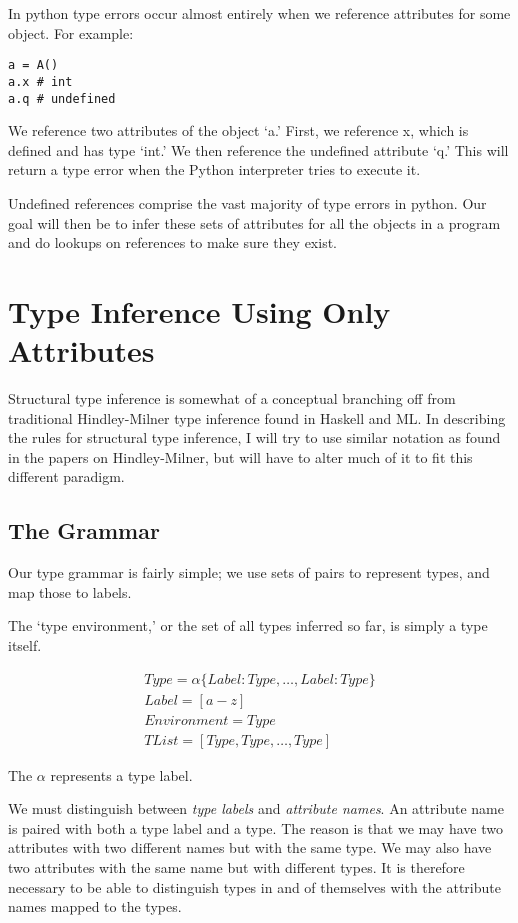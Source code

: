 \documentclass{article}
\begin{document}
In python type errors occur almost entirely when we reference attributes for some object. For example:

\begin{verbatim}
a = A()
a.x # int
a.q # undefined
\end{verbatim}

We reference two attributes of the object `a.' First, we reference x, which is
defined and has type `int.' We then reference the undefined attribute `q.' This
will return a type error when the Python interpreter tries to execute it.

Undefined references comprise the vast majority of type errors in python. Our
goal will then be to infer these sets of attributes for all the objects in a
program and do lookups on references to make sure they exist.

\section*{Type Inference Using Only Attributes}

Structural type inference is somewhat of a conceptual branching off from
traditional Hindley-Milner type inference found in Haskell and ML. In
describing the rules for structural type inference, I will try to use similar
notation as found in the papers on Hindley-Milner, but will have to alter much
of it to fit this different paradigm.

\subsection*{The Grammar}

Our type grammar is fairly simple; we use sets of pairs to represent types, and
map those to labels.

The `type environment,' or the set of all types inferred so far, is simply a
type itself.

\begin{align*}
Type = \alpha\{ Label : Type, \dots, Label : Type \} \\
Label = [a-z] \\
Environment = Type \\
TList = [Type, Type, \dots, Type]
\end{align*}

The $\alpha$ represents a type label.

We must distinguish between \emph{type labels} and \emph{attribute names}.  An
attribute name is paired with both a type label and a type. The reason is that
we may have two attributes with two different names but with the same type. We
may also have two attributes with the same name but with different types. It is
therefore necessary to be able to distinguish types in and of themselves with the
attribute names mapped to the types.
\end{document}
